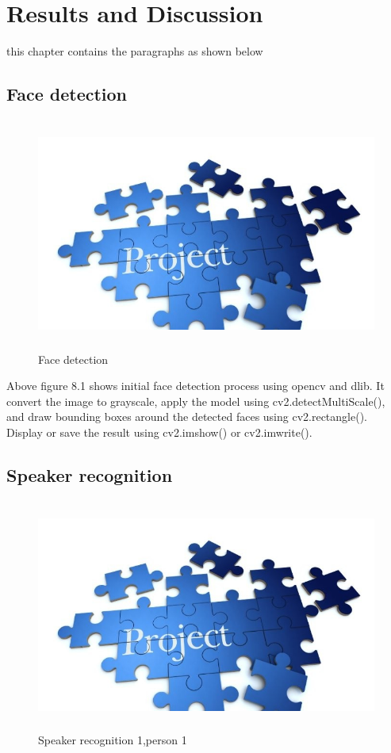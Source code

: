 \documentclass[12pt,a4paper]{report}
\begin{document}
\chapter{Results and Discussion}
this chapter contains the paragraphs as shown below
\section{Face detection}
\begin{figure} [hbtp]
\centering
\includegraphics[width=5in,height=3in]{./pic/sample.jpg}
\caption{Face detection}
\end{figure}
\par Above figure 8.1 shows initial face detection process using opencv and dlib. It convert the image to grayscale, apply the model using cv2.detectMultiScale(), and draw bounding boxes around the detected faces using cv2.rectangle(). Display or save the result using cv2.imshow() or cv2.imwrite().

\section{Speaker recognition}
\begin{figure} [hbtp]
\centering
\includegraphics[width=5in,height=3in]{./pic/sample.jpg}
\caption{Speaker recognition 1,person 1}
\end{figure}
\end{document}
